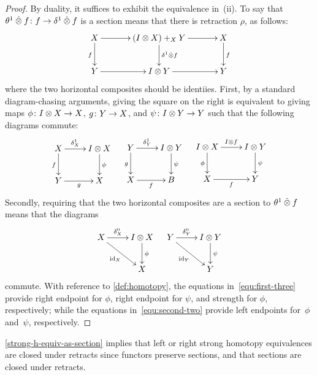 \documentclass[reqno,10pt,a4paper,oneside,draft]{amsart}
\begin{document}
\begin{proof}
By duality, it suffices to exhibit the equivalence in~(ii).
To say that $\theta^{1} \mathbin{\hat{\otimes}} f \colon f \to \delta^1 \mathbin{\hat{\otimes}} f$ is a section means that there is retraction $\rho$, as follows:
\[
\xymatrix@C+1em{
  X \ar[r] \ar[d]_f & (\interval \otimes X) +_{X} Y \ar[d]^{\rcyl \hatotimes f}  \ar[r]  & X \ar[d]^f \\
  Y \ar[r] & \interval \otimes Y \ar[r] & Y }
\]
where the two horizontal composites should be identiies.
First, by a standard diagram-chasing arguments, giving the square on the right is equivalent to giving maps $\phi \colon I \otimes X \to X$, $g \colon Y \to X$, and $\psi \colon I \otimes Y \to Y$ such that the following diagrams commute:
\begin{align} \label{equ:first-three}
\xycenter{
  X \ar[r]^-{\rcyl_X}  \ar[d]_f & \interval \otimes X \ar[d]^{\phi} \\
  Y \ar[r]_{g} & X
}
&&
\xycenter{
  Y \ar[r]^-{\rcyl_Y} \ar[d]_g & \interval \otimes Y \ar[d]^{\psi} \\
  X \ar[r]_f & B
}
&&
\xycenter{
  \interval \otimes X \ar[d]_\phi \ar[r]^{I \otimes f} & \interval \otimes Y \ar[d]^\psi \\
  X \ar[r]_{f} & Y
}
\end{align}
Secondly, requiring that the two horizontal composites are a section to $\theta^{1} \mathbin{\hat{\otimes}} f$ means that the diagrams
\begin{align} \label{equ:second-two}
\xycenter{
  X \ar[r]^-{\lcyl_X} \ar[dr]_{\id_X} & \interval \otimes X \ar[d]^\phi \\
  & X
}
&&
\xycenter{
  Y \ar[r]^-{\lcyl_Y}  \ar[dr]_{\id_Y} & \interval \otimes Y \ar[d]^{\psi} \\
  & Y
}
\end{align}
commute.
With reference to \cref{def:homotopy}, the equations in~\eqref{equ:first-three} provide right endpoint for $\phi$, right endpoint for $\psi$, and strength for $\phi$, respectively; while the equations in~\eqref{equ:second-two} provide left endpoints for~$\phi$ and~$\psi$, respectively.
\end{proof}

\cref{strong-h-equiv-as-section} implies that left or right strong homotopy equivalences are closed under retracts since functors preserve sections, and that sections are closed under retracts.
\end{document}
